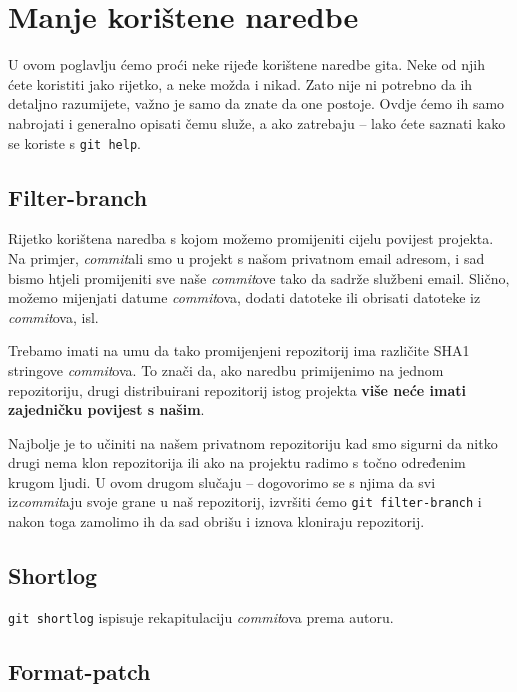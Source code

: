 \chapter*{Manje korištene naredbe}

U ovom poglavlju ćemo proći neke rijeđe korištene naredbe gita.
Neke od njih ćete koristiti jako rijetko, a neke možda i nikad.
Zato nije ni potrebno da ih detaljno razumijete, važno je samo da znate da one postoje. 
Ovdje ćemo ih samo nabrojati i generalno opisati čemu služe, a ako zatrebaju -- lako ćete saznati kako se koriste s \verb+git help+.

\section*{Filter-branch}

Rijetko korištena naredba s kojom možemo promijeniti cijelu povijest projekta.
Na primjer, \emph{commit}ali smo u projekt s našom privatnom email adresom, i sad bismo htjeli promijeniti sve naše \emph{commit}ove tako da sadrže službeni email.
Slično, možemo mijenjati datume \emph{commit}ova, dodati datoteke ili obrisati datoteke iz \emph{commit}ova, isl.

Trebamo imati na umu da tako promijenjeni repozitorij ima različite SHA1 stringove \emph{commit}ova.
To znači da, ako naredbu primijenimo na jednom repozitoriju, drugi distribuirani repozitorij istog projekta \textbf{više neće imati zajedničku povijest s našim}.

Najbolje je to učiniti na našem privatnom repozitoriju kad smo sigurni da nitko drugi nema klon repozitorija ili ako na projektu radimo s točno određenim krugom ljudi.
U ovom drugom slučaju -- dogovorimo se s njima da svi iz\emph{commit}aju svoje grane u naš repozitorij, izvršiti ćemo \verb+git filter-branch+ i nakon toga zamolimo ih da sad obrišu i iznova kloniraju repozitorij.

\section*{Shortlog}

\verb+git shortlog+ ispisuje rekapitulaciju \emph{commit}ova prema autoru.

\section*{Format-patch}

